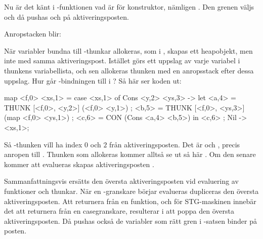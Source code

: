 \documentclass[../Core]{subfiles}
\begin{document}
Nu är det känt i -funktionen vad  är för konstruktor, nämligen
. Den grenen väljs och då pushas  och 
 på aktiveringsposten. 

Anropstacken blir:
\begin{codeEx}
\end{codeEx}

När variabler bundna till -thunkar allokeras, som 
i , skapas ett heapobjekt, men inte med samma aktiveringspost.
Istället görs ett uppslag av varje variabel i thunkens variabellista, och
sen allokeras thunken med en anropsstack efter dessa uppslag. Hur går 
-bindningen till i ? Så här ser koden ut:

\begin{codeEx}
map <f,0> <xs,1> = case <xs,1> of
    { Cons <y,2> <ys,3> -> let
        { <a,4> = THUNK [<f,0>, <y,2>]  (<f,0> <y,1>)
        ; <b,5> = THUNK [<f,0>, <ys,3>] (map <f,0> <ys,1>)
        ; <c,6> = CON (Cons <a,4> <b,5>)
        } in <c,6>
    ; Nil -> <xs,1>};
\end{codeEx}

Så -thunken  vill ha index $0$ och $2$ från
aktiveringsposten. Det är  och , precis anropen till
. 
Thunken som allokeras kommer alltså se ut så här
.
Om den senare kommer att evalueras skapas aktiveringsposten \ic{[cube,1]}.


Sammanfattningsvis ersätts den översta aktiveringsposten vid 
evaluering av funktioner och thunkar. När en -granskare börjar evalueras
dupliceras den översta aktiveringsposten. Att returnera från en funktion,
och för STG-maskinen innebär det att returnera från en casegranskare,
resulterar i att poppa den översta aktiveringsposten. Då pushas också 
de variabler som rätt gren i -satsen binder på posten.  





   



 
\end{document}
